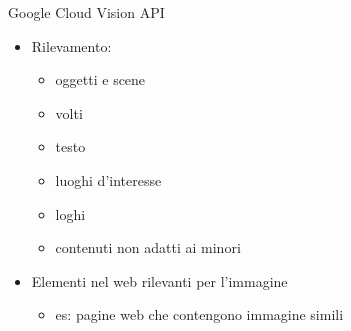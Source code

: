 %
\begin{frame}[t]{Google Cloud Vision API}
\begin{itemize}
	\item Rilevamento:
	\begin{itemize}
		\item oggetti e scene
		\item volti
		\item testo
		\item luoghi d'interesse
		\item loghi
		\item contenuti non adatti ai minori
	\end{itemize}
	\item Elementi nel web rilevanti per l'immagine
	\begin{itemize}
		\item es: pagine web che contengono immagine simili
	\end{itemize}
\end{itemize}
\end{frame}
%
